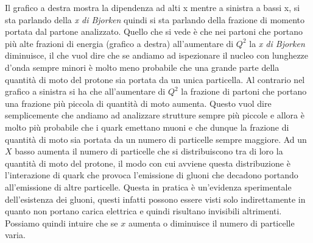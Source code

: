 Il grafico a destra mostra la dipendenza ad alti x mentre a sinistra a bassi x, si sta parlando della \emph{x di Bjorken} quindi si sta parlando della frazione di momento portata dal partone analizzato.
Quello che si vede è che nei partoni che portano più alte frazioni di energia (grafico a destra) all'aumentare di $Q^2$ la \emph{x di Bjorken} diminuisce, il che vuol dire che se andiamo ad ispezionare il nucleo con lunghezze d'onda sempre minori è molto meno probabile che una grande parte della quantità di moto del protone sia portata da un unica particella.
Al contrario nel grafico a sinistra si ha che all'aumentare di $Q^2$ la frazione di partoni che portano una frazione più piccola di quantità di moto aumenta.
Questo vuol dire semplicemente che andiamo ad analizzare strutture sempre più piccole e allora è molto più probabile che i quark emettano muoni e che dunque la frazione di quantità di moto sia portata da un numero di particelle sempre maggiore.
Ad un $X$ basso aumenta il numero di particelle che si distribuiscono tra di loro la quantità di moto del protone, il modo con cui avviene questa distribuzione è l'interazione di quark che provoca l'emissione di gluoni che decadono portando all'emissione di altre particelle.
Questa in pratica è un'evidenza sperimentale dell'esistenza dei gluoni, questi infatti possono essere visti solo indirettamente in quanto non portano carica elettrica e quindi risultano invisibili altrimenti.
Possiamo quindi intuire che se $x$ aumenta o diminuisce il numero di particelle varia.



